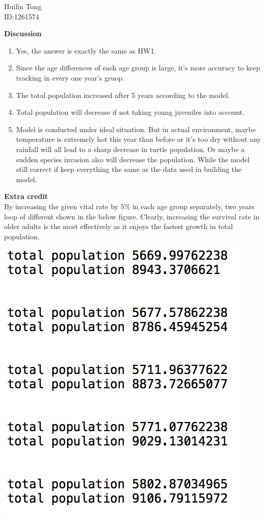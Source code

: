 \documentclass{article}
\begin{document}
\begin{center} Huilin Tong\\
ID:1261574
\end{center}

{\bf Discussion}\\

\begin{enumerate}
\item Yes, the answer is exactly the same as HW1.
\item Since the age differences of each age group is large, it's more accuracy to keep tracking in every one year's gruop.
\item The total population increased after 5 years according to the model.
\item Total population will decrease if not taking young juveniles into account.
\item Model is conducted under ideal situation. But in actual environment, maybe temperature is extremely hot this year than before or it's too dry without any rainfall will all lead to a sharp decrease in turtle population. Or maybe a sudden species invasion also will decrease the population. While the model still correct if keep everything the same as the data used in building the model.
	
\end{enumerate}

{\bf Extra credit}\\
By increasing the given vital rate by $5\%$ in each age group separately, two years loop of different shown in the below figure. Clearly, increasing the survival rate in older adults is the most effectively as it enjoys the fastest growth in total population. 


\includegraphics[scale=0.6]{EC.png}	
\end{document}
